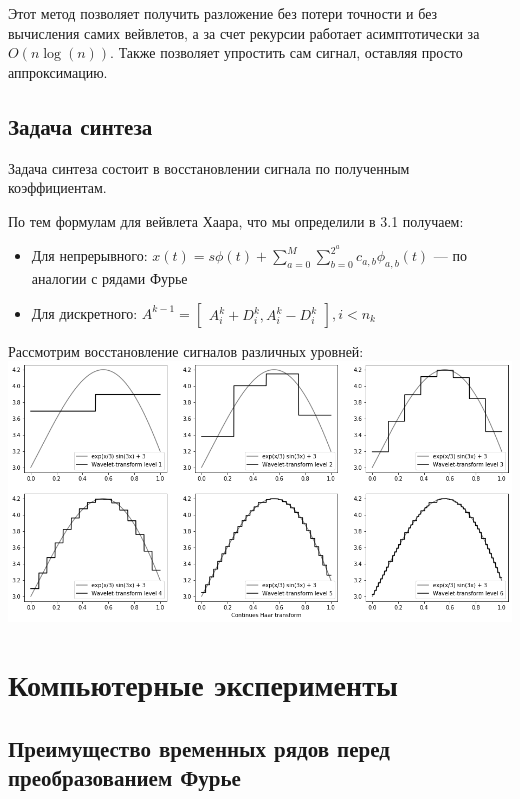 \documentclass[a4paper]{article}
\begin{document}
	Этот метод позволяет получить разложение без потери точности и без вычисления самих вейвлетов, а за счет рекурсии работает асимптотически за $O(n \log(n))$. Также позволяет упростить сам сигнал, оставляя просто аппроксимацию.
	
	\subsection{Задача синтеза}
	
	Задача синтеза состоит в восстановлении сигнала по полученным коэффициентам.
	
	По тем формулам для вейвлета Хаара, что мы определили в 3.1 получаем:
	
	\begin{itemize}
		\item Для непрерывного: $ x(t) = s \phi(t) + \sum_{a=0}^{M} \sum_{b=0}^{2^a} c_{a, b} \phi_{a, b}(t) $ --- по аналогии с рядами Фурье
		\item Для дискретного: $
			A^{k - 1} = 
			\begin{bmatrix}
				A^k_i + D^k_i, A^k_i - D^k_i
			\end{bmatrix}, i < n_k
		$
	\end{itemize}

	\begin{center}
		Рассмотрим восстановление сигналов различных уровней:
		\includegraphics[scale=0.5]{./output_5_0.png}
	\end{center}
	
	\newpage
	
	\section{Компьютерные эксперименты}
	
	\subsection{Преимущество временных рядов перед преобразованием Фурье}
	
\end{document}
